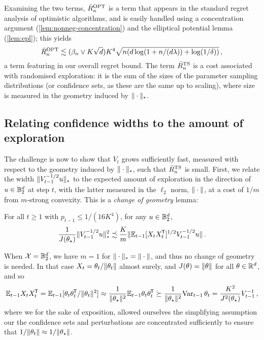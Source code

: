 Examining the two terms, $\bar{R}^{\text{OPT}}_n$ is a term that appears in the standard regret analysis of optimistic algorithms, and is easily handled using a concentration argument (\cref{lem:nonneg-concentration}) and the elliptical potential lemma (\cref{lem:epl}); this yields
$$
  \bar{R}^{\text{OPT}}_n \lesssim (\beta_n \vee K\sqrt{d}) K^4 \sqrt{n (d\log(1+n/(d\lambda)) + \log(1/\delta))}\,,
$$
a term featuring in our overall regret bound. The term $\bar{R}^{\text{TS}}_n$ is a cost associated with randomised exploration: it is the sum of the sizes of the parameter sampling distributions (or confidence sets, as these are the same up to scaling), where size is measured in the geometry induced by $\|\cdot\|_{*}$.

\subsection{Relating confidence widths to the amount of exploration} 

The challenge is now to show that $V_t$ grows sufficiently fast, measured with respect to the geometry induced by $\|\cdot\|_{*}$, such that $\bar{R}^{\text{TS}}_n$ is small. First, we relate the width $\|V_{t-1}^{-1/2}u\|_{*}$ to the expected amount of exploration in the direction of $u \in \mathbb{B}^d_2$ at step $t$, with the latter measured in the $\ell_2$ norm, $\|\cdot\|$, at a cost of $1/m$ from $m$-strong convexity. This is a \emph{change of geometry} lemma:

\begin{lemma}\label{lem:geometry}
  For all $t \geq 1$ with $p_{t-1} \leq 1/(16K^4)$, for any $u \in \mathbb{B}^d_2$,
  $$ %
  \frac{1}{J(\thetaopt)}\snorm{\Vt^{-1/2}u}^2 \precsim \frac{K}{m} \norm{\Et[\Xt\Xt\tran]^{1/2} \Vt^{-1/2} u }\,.
  $$
\end{lemma}

\begin{remark}
  When $\mathcal{X} = \mathbb{B}^d_2$, we have $m=1$ for $\|\cdot\|_{*} = \|\cdot\|$, and thus no change of geometry is needed. In that case $X_t = \theta_t/\|\theta_t\|$ almost surely, and $J(\theta) = \|\theta\|$ for all $\theta \in \mathbb{R}^d$, and so
$$
  \mathbb{E}_{t-1} X_tX_t^{\mkern-1.5mu\mathsf{T}} = \mathbb{E}_{t-1}[\theta_t\theta_t^{\mkern-1.5mu\mathsf{T}}/\|\theta_t\|^2] \approx \frac{1}{\|\theta_\star\|^2}\mathbb{E}_{t-1} \theta_t\theta_t^{\mkern-1.5mu\mathsf{T}} \succeq \frac{1}{\|\theta_\star\|^2}\mathrm{Var}_{t-1}\, \theta_t = \frac{K^2}{J^2(\theta_\star)}V_{t-1}^{-1}\,,
$$
where we for the sake of exposition, allowed ourselves the simplifying assumption our the confidence sets and perturbations are concentrated sufficiently to ensure that $1/\|\theta_t\| \approx 1/\|\theta_\star\|$.
\end{remark}

